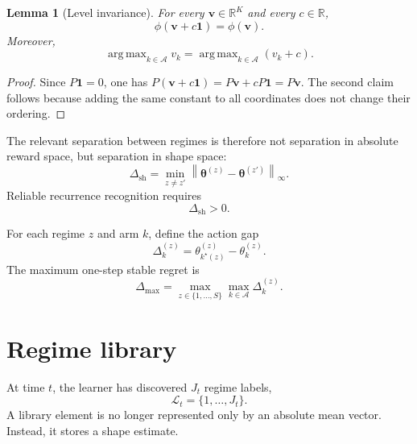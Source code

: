 \documentclass[11pt]{article}
\newtheorem{lemma}{Lemma}
\newcommand{\A}{\mathcal A}
\newcommand{\R}{\mathbb R}
\newcommand{\one}{\bm 1}
\newcommand{\norm}[1]{\left\lVert #1 \right\rVert}
\DeclareMathOperator*{\argmax}{arg\,max}
\begin{document}
\begin{lemma}[Level invariance]
\label{lem:level_invariance}
For every $\bm v\in\R^K$ and every $c\in\R$,
\begin{equation}
\label{eq:level_invariance}
\phi(\bm v+c\one)=\phi(\bm v).
\end{equation}
Moreover,
\begin{equation}
\label{eq:argmax_invariance}
\argmax_{k\in\A} v_k
=
\argmax_{k\in\A} (v_k+c).
\end{equation}
\end{lemma}

\begin{proof}
Since $P\one=0$, one has $P(\bm v+c\one)=P\bm v+cP\one=P\bm v$. The second claim follows because adding the same constant to all coordinates does not change their ordering.
\end{proof}

The relevant separation between regimes is therefore not separation in absolute reward space, but separation in shape space:
\begin{equation}
\label{eq:shape_separation}
\Delta_{\mathrm{sh}}
=
\min_{z\neq z'}
\norm{\bm\theta^{(z)}-\bm\theta^{(z')}}_{\infty}.
\end{equation}
Reliable recurrence recognition requires
\begin{equation}
\label{eq:positive_shape_sep}
\Delta_{\mathrm{sh}}>0.
\end{equation}

For each regime $z$ and arm $k$, define the action gap
\begin{equation}
\label{eq:arm_gap}
\Delta_k^{(z)}
=
\theta_{k^\star(z)}^{(z)}-\theta_k^{(z)}.
\end{equation}
The maximum one-step stable regret is
\begin{equation}
\label{eq:max_gap}
\Delta_{\max}
=
\max_{z\in\{1,\ldots,S\}}
\max_{k\in\A}
\Delta_k^{(z)}.
\end{equation}

\section{Regime library}
\label{sec:regime_library}

At time $t$, the learner has discovered $J_t$ regime labels,
\begin{equation}
\label{eq:library}
\mathcal L_t=\{1,\ldots,J_t\}.
\end{equation}
A library element is no longer represented only by an absolute mean vector. Instead, it stores a shape estimate.
\end{document}
